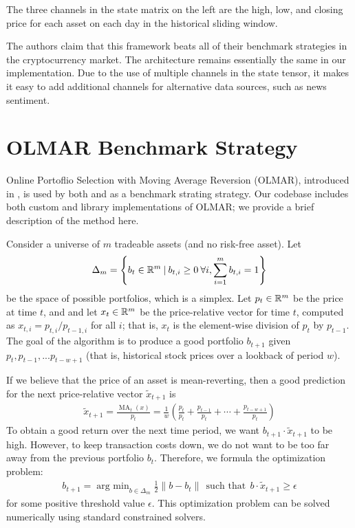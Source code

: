 The three channels in the state matrix on the left are the high, low, and closing price for each asset on each day in the historical sliding window.

The authors claim that this framework beats all of their benchmark strategies in the cryptocurrency market.
The architecture remains essentially the same in our implementation. Due to the use of multiple channels in the state tensor, it makes it easy to
add additional channels for alternative data sources, such as news sentiment.



\section{OLMAR Benchmark Strategy}
\label{olmar_section}
Online Portoflio Selection with Moving Average Reversion (OLMAR), introduced in \cite{olmar_paper}, is used by both \cite{rl_augmented_states} and \cite{drl_framework} as a benchmark strating strategy.
Our codebase includes both custom and library implementations of OLMAR; we provide a brief description of the method here.

Consider a universe of $m$ tradeable assets (and no risk-free asset).
Let $$\Delta_m = \left\{b_t \in \mathbb{R}^m \:|\: b_{t,i} \geq 0 \:\forall i, \sum_{i=1}^m b_{t,i} = 1\right\}$$ be the space of possible portfolios, which is a simplex.
Let $p_t \in \mathbb{R}^{m}$ be the price at time $t$, and and let $x_t \in \mathbb{R}^m$ be the price-relative vector for time $t$, computed as
$x_{t,i} = p_{t,i} / p_{t-1,i}$ for all $i$; that is, $x_t$ is the element-wise division of $p_t$ by $p_{t-1}$.
The goal of the algorithm is to produce a good portfolio $b_{t+1}$ given $p_t, p_{t-1}, ... p_{t-w+1}$ (that is, historical stock prices over a lookback of period $w$).

If we believe that the price of an asset is mean-reverting, then a good prediction for the next price-relative vector $\tilde x_{t+1}$ is
\begin{align*}
  \tilde x_{t+1} = \frac{\mathop{\mathrm{MA}}_t(x)}{p_t} = \frac{1}{w}\left(\frac{p_t}{p_t} + \frac{p_{t-1}}{p_t} + \cdots + \frac{p_{t-w+1}}{p_t}\right)
\end{align*}
To obtain a good return over the next time period, we want $b_{t+1} \cdot \tilde x_{t+1}$ to be high.
However, to keep transaction costs down, we do not want to be too far away from the previous portfolio $b_t$.
Therefore, we formula the optimization problem:
\begin{align*}
  b_{t+1} = \mathop{\mathrm{arg\:min}}_{b \in \Delta_m} \frac{1}{2}\|b - b_t\| \:\:\text{such that}\:\: b \cdot \tilde{x}_{t+1} \geq \epsilon
\end{align*}
for some positive threshold value $\epsilon$. This optimization problem can be solved numerically using standard constrained solvers.

